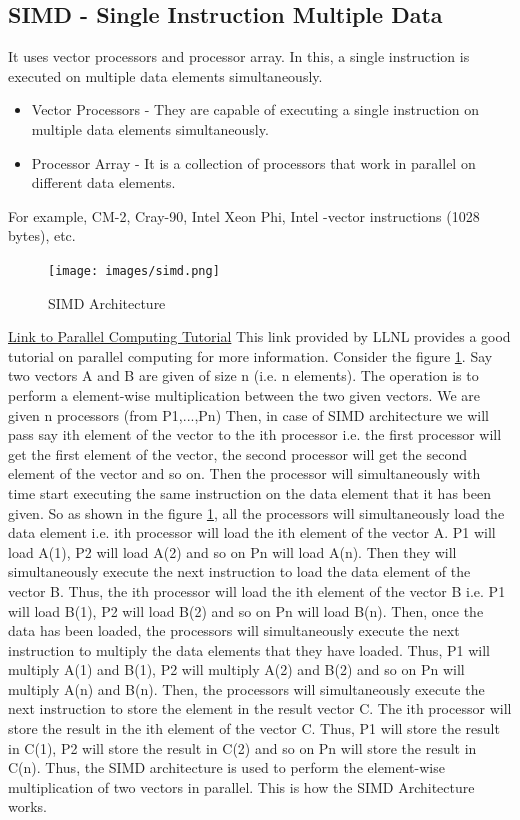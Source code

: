 \documentclass[12pt]{article}
\begin{document}
\subsection{SIMD - Single Instruction Multiple Data}
It uses vector processors and processor array. In this, a single instruction is executed on multiple data elements simultaneously. 
\begin{itemize}
    \item Vector Processors - They are capable of executing a single instruction on multiple data elements simultaneously.
    \item Processor Array - It is a collection of processors that work in parallel on different data elements.
\end{itemize}
For example, CM-2, Cray-90, Intel Xeon Phi, Intel -vector instructions (1028 bytes), etc.
\begin{figure}[H]
    \centering
    \texttt{[image: images/simd.png]}
    \caption{SIMD Architecture}
    \label{fig:simd}
\end{figure}
\href{http://www.llnl.gov/computing/tutorials/parallel_comp/}{Link to Parallel Computing Tutorial}
This link provided by LLNL provides a good tutorial on parallel computing for more information. 
Consider the figure \ref{fig:simd}. Say two vectors A and B are given of size n (i.e. n elements). The operation is to perform 
a element-wise multiplication between the two given vectors. We are given n processors (from P1,...,Pn) Then, in case of SIMD architecture we will pass 
say ith element of the vector to the ith processor i.e. the first processor will get the first element of the vector,
the second processor will get the second element of the vector and so on. Then the processor will simultaneously with time
start executing the same instruction on the data element that it has been given. So as shown in the figure \ref{fig:simd}, 
all the processors will simultaneously load the data element i.e. ith processor will load the ith element of the vector A.
P1 will load A(1), P2 will load A(2) and so on Pn will load A(n). Then they will simultaneously execute the next instruction to load the data element of the vector B. 
Thus, the ith processor will load the ith element of the vector B i.e. P1 will load B(1), P2 will load B(2) and so on Pn will load B(n). 
Then, once the data has been loaded, the processors will simultaneously execute the next instruction to multiply the data elements that they have loaded.
Thus, P1 will multiply A(1) and B(1), P2 will multiply A(2) and B(2) and so on Pn will multiply A(n) and B(n). 
Then, the processors will simultaneously execute the next instruction to store the element in the result vector C. The ith processor will store the result in the ith element of the vector C.
Thus, P1 will store the result in C(1), P2 will store the result in C(2) and so on Pn will store the result in C(n).
Thus, the SIMD architecture is used to perform the element-wise multiplication of two vectors in parallel. This is how the SIMD Architecture works.
\end{document}
